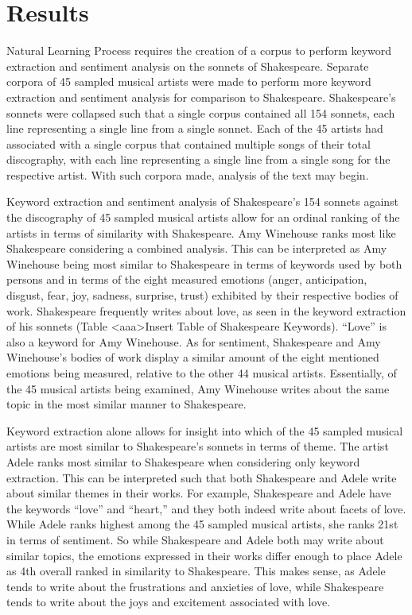 \documentclass[11pt]{article}
\begin{document}
\section{Results}
Natural Learning Process requires the creation of a corpus to perform keyword extraction and sentiment analysis on the sonnets of Shakespeare. Separate corpora of 45 sampled musical artists were made to perform more keyword extraction and sentiment analysis for comparison to Shakespeare. Shakespeare’s sonnets were collapsed such that a single corpus contained all 154 sonnets, each line representing a single line from a single sonnet. Each of the 45 artists had associated with a single corpus that contained multiple songs of their total discography, with each line representing a single line from a single song for the respective artist. With such corpora made, analysis of the text may begin.

\newpage

\noindent Keyword extraction and sentiment analysis of Shakespeare’s 154 sonnets against the discography of 45 sampled musical artists allow for an ordinal ranking of the artists in terms of similarity with Shakespeare. Amy Winehouse ranks most like Shakespeare considering a combined analysis. This can be interpreted as Amy Winehouse being most similar to Shakespeare in terms of keywords used by both persons and in terms of the eight measured emotions (anger, anticipation, disgust, fear, joy, sadness, surprise, trust) exhibited by their respective bodies of work. Shakespeare frequently writes about love, as seen in the keyword extraction of his sonnets (Table <aaa>Insert Table of Shakespeare Keywords). “Love” is also a keyword for Amy Winehouse. As for sentiment, Shakespeare and Amy Winehouse’s bodies of work display a similar amount of the eight mentioned emotions being measured, relative to the other 44 musical artists. Essentially, of the 45 musical artists being examined, Amy Winehouse writes about the same topic in the most similar manner to Shakespeare.




\noindent Keyword extraction alone allows for insight into which of the 45 sampled musical artists are most similar to Shakespeare’s sonnets in terms of theme. The artist Adele ranks most similar to Shakespeare when considering only keyword extraction. This can be interpreted such that both Shakespeare and Adele write about similar themes in their works. For example, Shakespeare and Adele have the keywords “love” and “heart,” and they both indeed write about facets of love. While Adele ranks highest among the 45 sampled musical artists, she ranks 21st in terms of sentiment. So while Shakespeare and Adele both may write about similar topics, the emotions expressed in their works differ enough to place Adele as 4th overall ranked in similarity to Shakespeare. This makes sense, as Adele tends to write about the frustrations and anxieties of love, while Shakespeare tends to write about the joys and excitement associated with love. 
\end{document}
